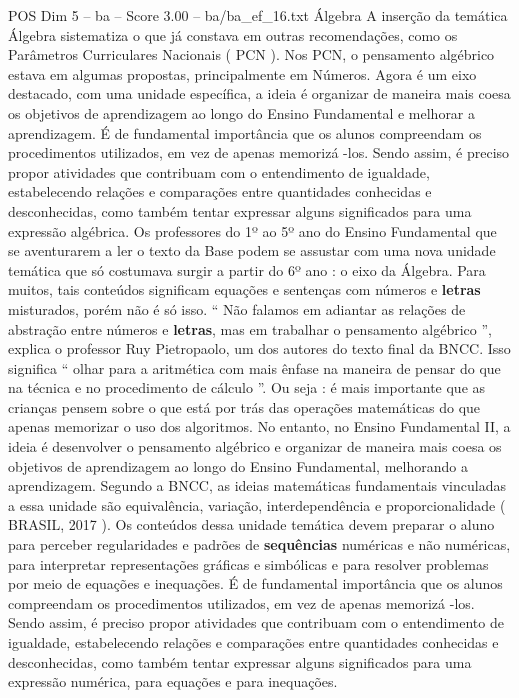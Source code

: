 \begin{textsample}{POS Dim 5 – ba – Score 3.00 – ba/ba\_ef\_16.txt}
Álgebra A inserção da temática Álgebra sistematiza o que já constava em outras recomendações, como os Parâmetros Curriculares Nacionais ( PCN ).
Nos PCN, o pensamento algébrico estava em algumas propostas, principalmente em Números.
Agora é um eixo destacado, com uma unidade específica, a ideia é organizar de maneira mais coesa os objetivos de aprendizagem ao longo do Ensino Fundamental e melhorar a aprendizagem.
É de fundamental importância que os alunos compreendam os procedimentos utilizados, em vez de apenas memorizá -los.
Sendo assim, é preciso propor atividades que contribuam com o entendimento de igualdade, estabelecendo relações e comparações entre quantidades conhecidas e desconhecidas, como também tentar expressar alguns significados para uma expressão algébrica.
Os professores do 1º ao 5º ano do Ensino Fundamental que se aventurarem a ler o texto da Base podem se assustar com uma nova unidade temática que só costumava surgir a partir do 6º ano : o eixo da Álgebra.
Para muitos, tais conteúdos significam equações e sentenças com números e \textbf{letras} misturados, porém não é só isso. “ Não falamos em adiantar as relações de abstração entre números e \textbf{letras}, mas em trabalhar o pensamento algébrico ”, explica o professor Ruy Pietropaolo, um dos autores do texto final da BNCC.
Isso significa “ olhar para a aritmética com mais ênfase na maneira de pensar do que na técnica e no procedimento de cálculo ”.
Ou seja : é mais importante que as crianças pensem sobre o que está por trás das operações matemáticas do que apenas memorizar o uso dos algoritmos.
No entanto, no Ensino Fundamental II, a ideia é desenvolver o pensamento algébrico e organizar de maneira mais coesa os objetivos de aprendizagem ao longo do Ensino Fundamental, melhorando a aprendizagem.
Segundo a BNCC, as ideias matemáticas fundamentais vinculadas a essa unidade são equivalência, variação, interdependência e proporcionalidade ( BRASIL, 2017 ).
Os conteúdos dessa unidade temática devem preparar o aluno para perceber regularidades e padrões de \textbf{sequências} numéricas e não numéricas, para interpretar representações gráficas e simbólicas e para resolver problemas por meio de equações e inequações.
É de fundamental importância que os alunos compreendam os procedimentos utilizados, em vez de apenas memorizá -los.
Sendo assim, é preciso propor atividades que contribuam com o entendimento de igualdade, estabelecendo relações e comparações entre quantidades conhecidas e desconhecidas, como também tentar expressar alguns significados para uma expressão numérica, para equações e para inequações.

\end{textsample}

